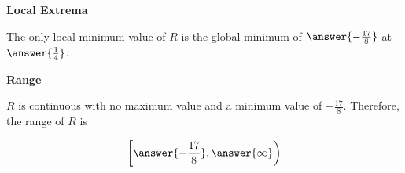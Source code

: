 \documentclass{ximera}
\begin{document}
\begin{exercise}
\begin{question}  \textbf{\textcolor{blue!55!black}{Local Extrema}}

The only local minimum value of $R$ is the global minimum of $\answer{-\frac{17}{8}}$ at $\answer{\frac{1}{4}}$.

\end{question}







\begin{question}  \textbf{\textcolor{blue!55!black}{Range}}

$R$ is continuous with no maximum value and a minimum value of $-\frac{17}{8}$.  Therefore, the range of $R$ is

\[
\left[ \answer{-\frac{17}{8}}, \answer{\infty} \right)
\]

\end{question}


\end{exercise}
\end{document}
